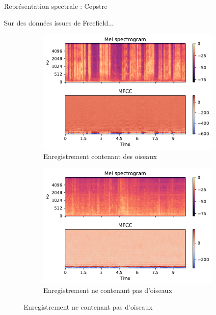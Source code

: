 \documentclass[compress,xcolor=table]{beamer}
\begin{document}
\begin{frame}{Représentation spectrale : Cepstre}

    Sur des données issues de Freefield...

    \begin{figure}[ht]
        \centering
        \begin{subfigure}[b]{0.45\textwidth}
            \centering
            \includegraphics[width=\textwidth]{images/audio/birds.mfcc.ff1010.pdf}
            \caption{Enregistrement contenant des oiseaux}
            \label{fig:birds.mfcc.ff1010}
        \end{subfigure}
        \hfill
        \begin{subfigure}[b]{0.45\textwidth}
            \centering
            \includegraphics[width=\textwidth]{images/audio/nobirds.mfcc.ff1010.pdf}
            \caption{Enregistrement ne contenant pas d'oiseaux}
            \label{fig:nobirds.mfcc.ff1010}
        \end{subfigure}
    \end{figure}

\end{frame}
\end{document}
